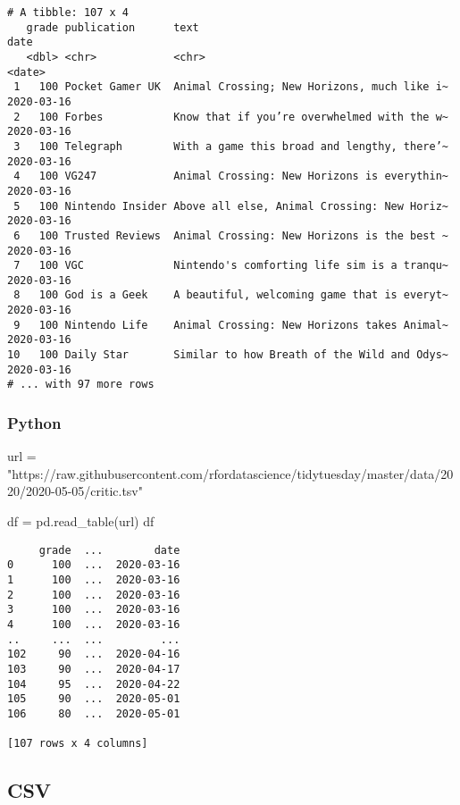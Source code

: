 \documentclass[
  letterpaper,
  DIV=11,
  numbers=noendperiod]{scrreprt}
\newenvironment{Shaded}{\begin{snugshade}}{\end{snugshade}}
\newcommand{\NormalTok}[1]{\textcolor[rgb]{0.00,0.46,0.62}{#1}}
\newcommand{\OperatorTok}[1]{\textcolor[rgb]{0.37,0.37,0.37}{#1}}
\newcommand{\StringTok}[1]{\textcolor[rgb]{0.13,0.47,0.30}{#1}}
\begin{document}
\begin{verbatim}
# A tibble: 107 x 4
   grade publication      text                                        date      
   <dbl> <chr>            <chr>                                       <date>    
 1   100 Pocket Gamer UK  Animal Crossing; New Horizons, much like i~ 2020-03-16
 2   100 Forbes           Know that if you’re overwhelmed with the w~ 2020-03-16
 3   100 Telegraph        With a game this broad and lengthy, there’~ 2020-03-16
 4   100 VG247            Animal Crossing: New Horizons is everythin~ 2020-03-16
 5   100 Nintendo Insider Above all else, Animal Crossing: New Horiz~ 2020-03-16
 6   100 Trusted Reviews  Animal Crossing: New Horizons is the best ~ 2020-03-16
 7   100 VGC              Nintendo's comforting life sim is a tranqu~ 2020-03-16
 8   100 God is a Geek    A beautiful, welcoming game that is everyt~ 2020-03-16
 9   100 Nintendo Life    Animal Crossing: New Horizons takes Animal~ 2020-03-16
10   100 Daily Star       Similar to how Breath of the Wild and Odys~ 2020-03-16
# ... with 97 more rows
\end{verbatim}

\hypertarget{python-1}{%
\subsubsection{Python}\label{python-1}}

\begin{Shaded}
\begin{Highlighting}[]
\NormalTok{url }\OperatorTok{=} \StringTok{"https://raw.githubusercontent.com/rfordatascience/tidytuesday/master/data/2020/2020{-}05{-}05/critic.tsv"}

\NormalTok{df }\OperatorTok{=}\NormalTok{ pd.read\_table(url)}
\NormalTok{df}
\end{Highlighting}
\end{Shaded}

\begin{verbatim}
     grade  ...        date
0      100  ...  2020-03-16
1      100  ...  2020-03-16
2      100  ...  2020-03-16
3      100  ...  2020-03-16
4      100  ...  2020-03-16
..     ...  ...         ...
102     90  ...  2020-04-16
103     90  ...  2020-04-17
104     95  ...  2020-04-22
105     90  ...  2020-05-01
106     80  ...  2020-05-01

[107 rows x 4 columns]
\end{verbatim}

\hypertarget{csv}{%
\subsection{CSV}\label{csv}}
\end{document}

